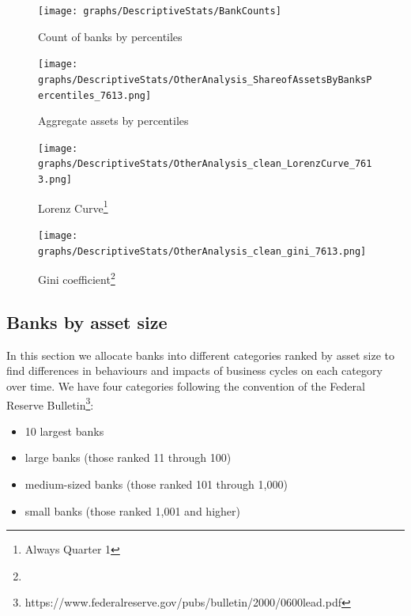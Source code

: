 \documentclass[12pt, a4paper]{article} %
\begin{document}
\begin{figure}[hbtp]
\centering
\caption{Count of banks by percentiles}
\texttt{[image: graphs/DescriptiveStats/BankCounts]}
\label{table:assetsByPercentiles}
\end{figure}


\begin{figure}[hbtp]
\centering
\caption{Aggregate assets by percentiles}
\texttt{[image: graphs/DescriptiveStats/OtherAnalysis\_ShareofAssetsByBanksPercentiles\_7613.png]}
\label{fig:assetsByPercentiles}
\end{figure}


\begin{figure}[hbtp]
\begin{minipage}{\textwidth}
\centering
\caption[1]{Lorenz Curve\footnote{Always Quarter 1} }
\texttt{[image: graphs/DescriptiveStats/OtherAnalysis\_clean\_LorenzCurve\_7613.png]}
\label{fig:lorenz}
\end{minipage}
\end{figure}


\begin{figure}[hbtp]
\begin{minipage}{\textwidth}
\centering
\caption[1]{Gini coefficient\footnote{} }
\texttt{[image: graphs/DescriptiveStats/OtherAnalysis\_clean\_gini\_7613.png]}
\label{fig:gini}
\end{minipage}
\end{figure}




\subsection{Banks by asset size}
\label{sec:banksByAssetSize}


In this section we allocate banks into different categories ranked by asset size to find differences in behaviours and impacts of business cycles on each category over time. We have four categories following the convention of the Federal Reserve Bulletin\footnote{https://www.federalreserve.gov/pubs/bulletin/2000/0600lead.pdf}:


\begin{itemize}
 \item 10 largest banks
 \item large banks (those ranked
  11 through 100)
 \item medium-sized banks (those ranked 101 through
 1,000)
 \item small banks (those ranked 1,001 and higher)
 \end{itemize} 
\end{document}

